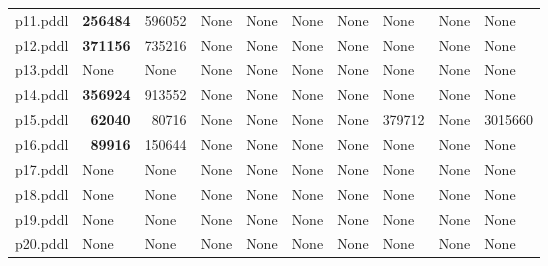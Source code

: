 \documentclass{article}
\begin{document}
\begin{tabular}{@{}lrrrrrrrrr@{}}
p11.pddl & \textbf{256484} & 596052 & \multicolumn{1}{|l|}{None} & \multicolumn{1}{|l|}{None} & \multicolumn{1}{|l|}{None} & \multicolumn{1}{|l|}{None} & \multicolumn{1}{|l|}{None} & \multicolumn{1}{|l|}{None} & \multicolumn{1}{|l|}{None} \\
p12.pddl & \textbf{371156} & 735216 & \multicolumn{1}{|l|}{None} & \multicolumn{1}{|l|}{None} & \multicolumn{1}{|l|}{None} & \multicolumn{1}{|l|}{None} & \multicolumn{1}{|l|}{None} & \multicolumn{1}{|l|}{None} & \multicolumn{1}{|l|}{None} \\
p13.pddl & \multicolumn{1}{|l|}{None} & \multicolumn{1}{|l|}{None} & \multicolumn{1}{|l|}{None} & \multicolumn{1}{|l|}{None} & \multicolumn{1}{|l|}{None} & \multicolumn{1}{|l|}{None} & \multicolumn{1}{|l|}{None} & \multicolumn{1}{|l|}{None} & \multicolumn{1}{|l|}{None} \\
p14.pddl & \textbf{356924} & 913552 & \multicolumn{1}{|l|}{None} & \multicolumn{1}{|l|}{None} & \multicolumn{1}{|l|}{None} & \multicolumn{1}{|l|}{None} & \multicolumn{1}{|l|}{None} & \multicolumn{1}{|l|}{None} & \multicolumn{1}{|l|}{None} \\
p15.pddl & \textbf{62040} & 80716 & \multicolumn{1}{|l|}{None} & \multicolumn{1}{|l|}{None} & \multicolumn{1}{|l|}{None} & \multicolumn{1}{|l|}{None} & 379712 & \multicolumn{1}{|l|}{None} & 3015660 \\
p16.pddl & \textbf{89916} & 150644 & \multicolumn{1}{|l|}{None} & \multicolumn{1}{|l|}{None} & \multicolumn{1}{|l|}{None} & \multicolumn{1}{|l|}{None} & \multicolumn{1}{|l|}{None} & \multicolumn{1}{|l|}{None} & \multicolumn{1}{|l|}{None} \\
p17.pddl & \multicolumn{1}{|l|}{None} & \multicolumn{1}{|l|}{None} & \multicolumn{1}{|l|}{None} & \multicolumn{1}{|l|}{None} & \multicolumn{1}{|l|}{None} & \multicolumn{1}{|l|}{None} & \multicolumn{1}{|l|}{None} & \multicolumn{1}{|l|}{None} & \multicolumn{1}{|l|}{None} \\
p18.pddl & \multicolumn{1}{|l|}{None} & \multicolumn{1}{|l|}{None} & \multicolumn{1}{|l|}{None} & \multicolumn{1}{|l|}{None} & \multicolumn{1}{|l|}{None} & \multicolumn{1}{|l|}{None} & \multicolumn{1}{|l|}{None} & \multicolumn{1}{|l|}{None} & \multicolumn{1}{|l|}{None} \\
p19.pddl & \multicolumn{1}{|l|}{None} & \multicolumn{1}{|l|}{None} & \multicolumn{1}{|l|}{None} & \multicolumn{1}{|l|}{None} & \multicolumn{1}{|l|}{None} & \multicolumn{1}{|l|}{None} & \multicolumn{1}{|l|}{None} & \multicolumn{1}{|l|}{None} & \multicolumn{1}{|l|}{None} \\
p20.pddl & \multicolumn{1}{|l|}{None} & \multicolumn{1}{|l|}{None} & \multicolumn{1}{|l|}{None} & \multicolumn{1}{|l|}{None} & \multicolumn{1}{|l|}{None} & \multicolumn{1}{|l|}{None} & \multicolumn{1}{|l|}{None} & \multicolumn{1}{|l|}{None} & \multicolumn{1}{|l|}{None} \\
\end{tabular}
\end{document}
